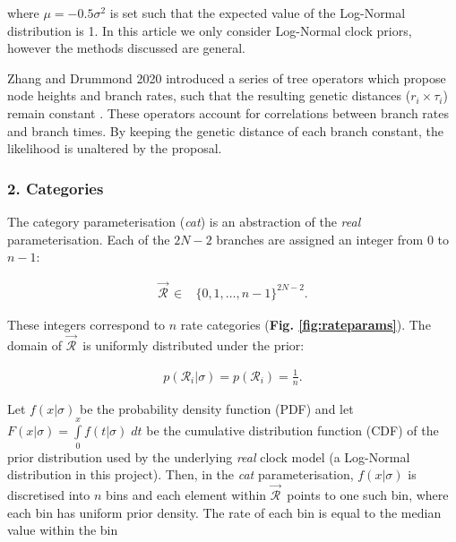 \documentclass[10pt,letterpaper]{article}
\begin{document}
where $\mu = -0.5\sigma^2$ is set such that the expected value of the Log-Normal distribution is 1.
In this article we only consider Log-Normal clock priors, however the methods discussed are general.


Zhang and Drummond 2020 introduced a series of tree operators which propose node heights and branch rates, such that the resulting genetic distances ($r_i \times \tau_i$) remain constant \cite{zhang2020improving}. 
These operators account for correlations between branch rates and branch times.
By keeping the genetic distance of each branch constant, the likelihood is unaltered by the proposal. 







\subsubsection*{2. Categories}
The category parameterisation (\textit{cat}) is an abstraction of the \textit{real} parameterisation. 
Each of the $2N-2$ branches are assigned an integer from $0$ to $n-1$:

\begin{align}
\vec{\mathcal{R}}^{\,} \in& \{ 0, 1, \dotso, n-1 \}^{2N-2}.
\end{align}


These integers correspond to $n$ rate categories (\textbf{Fig. \ref{fig:rateparams}}).
The domain of $\vec{\mathcal{R}}^{\,}$ is uniformly distributed under the prior:


\begin{align}
p(\mathcal{R}_i | \sigma) = p(\mathcal{R}_i) = \frac{1}{n}.
\end{align}



Let $f(x|\sigma)$ be the probability density function (PDF) and let $F(x|\sigma) = \int\limits_{0}^{x} f(t|\sigma) \; dt$ be the cumulative distribution function (CDF) of the prior distribution used by the underlying \textit{real} clock model (a Log-Normal distribution in this project). 
Then, in the \textit{cat} parameterisation, $f(x|\sigma)$ is discretised into $n$ bins and each element within $\vec{\mathcal{R}}^{\,}$ points to one such bin,
where each bin has uniform prior density.
 The rate of each bin is equal to the median value within the bin 
\end{document}
